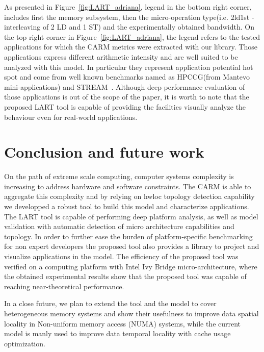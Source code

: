 \documentclass[twoside,twocolumn,8pt]{extarticle}
\begin{document}
As presented in Figure~\ref{fig:LART_adriana}, legend in the bottom right corner, includes first the memory subsystem,
then the micro-operation type(i.e. 2ld1st - interleaving of 2 LD and 1 ST) and the experimentally obtained bandwidth.
On the top right corner in Figure~\ref{fig:LART_adriana}, the legend refers to the tested applications for which the CARM metrics
were extracted with our library. Those applications express different arithmetic intensity and are well suited to be analyzed with
this model. In particular they represent application potential hot spot and come from well
known benchmarks named as HPCCG(from Mantevo~\cite{barrett2015assessing} mini-applications) and STREAM~\cite{mccalpin1995stream}.
Although deep performance evaluation of those applications is out of the scope of the
paper, it is worth to note that the proposed LART tool is capable of providing the facilities visually analyze the behaviour even
for real-world applications.

\section{Conclusion and future work}\label{sec:conclusion}

On the path of extreme scale computing, computer systems complexity is increasing to address hardware and software constraints.
The CARM is able to aggregate this complexity and by relying on hwloc topology detection capability we developped a robust tool to
build this model and characterize applications. The LART tool is capable of performing deep platform analysis,
as well as model validation with automatic detection of micro architecture capabilities and topology.
In order to further ease the burden of platform-specific benchmarking for non expert developers the proposed tool also provides a
library to project and visualize applications in the model.
The efficiency of the proposed tool was verified on a computing platform with Intel Ivy Bridge micro-architecture, where the
obtained experimental results show that the proposed tool was capable of reaching near-theoretical performance.

In a close future, we plan to extend the tool and the model to cover heterogeneous memory systems and show their usefulness to
improve data spatial locality in Non-uniform memory access (NUMA) systems, while the current model is manly used to improve data
temporal locality with cache usage optimization.



\end{document}
